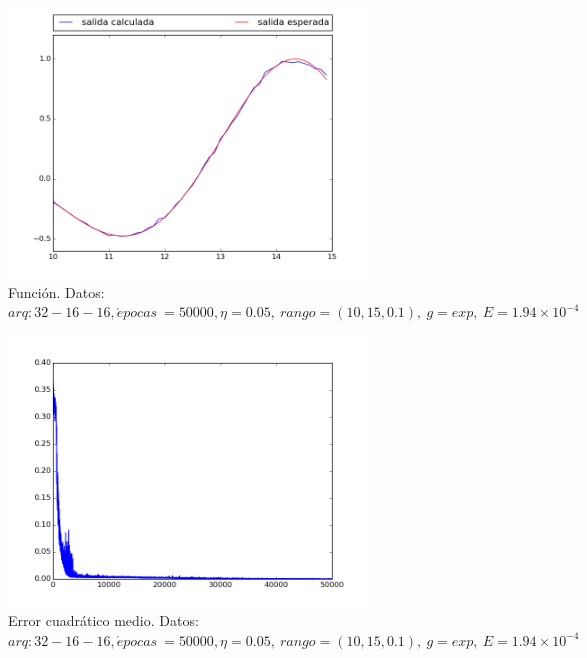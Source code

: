 \documentclass[12pt,a4paper]{article}
\begin{document}
\begin{figure}[H]
\centering
\includegraphics[width=0.85\textwidth]{img/_32__16__16_-eta_0_05-exp-FUNCTION.png}
\caption{\label{fig:test10-15-exp-fn-32} Función. Datos:  $arq: 32-16-16, \acute{e} pocas \ = 50000, \eta = 0.05,\ rango=(10, 15, 0.1),\ g=exp, \ E = 1.94 \times 10^{-4}$}
\end{figure}

\begin{figure}[H]
\centering
\includegraphics[width=0.85\textwidth]{img/_32__16__16_-eta_0_05-exp-ERROR.png}
\caption{\label{fig:test10-15-exp-error-32} Error cuadrático medio. Datos:  $arq: 32-16-16, \acute{e} pocas \ = 50000, \eta = 0.05,\ rango=(10, 15, 0.1),\ g=exp, \ E = 1.94 \times 10^{-4}$}
\end{figure}
\end{document}

